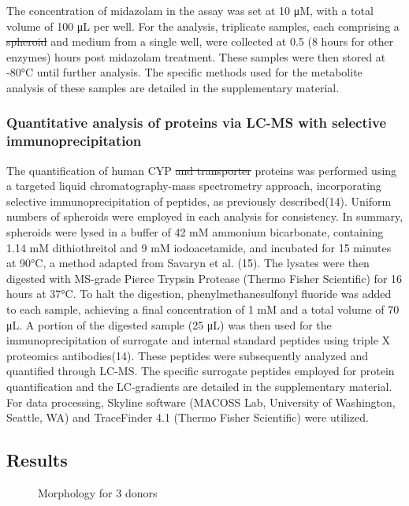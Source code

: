 \documentclass[
  letterpaper,
  DIV=11,
  numbers=noendperiod,
  oneside]{scrartcl}
\begin{document}
The concentration of midazolam in the assay was set at 10 μM, with a
total volume of 100 μL per well. For the analysis, triplicate samples,
each comprising a \st{spheroid} and medium from a single well, were
collected at 0.5 (8 hours for other enzymes) hours post midazolam
treatment. These samples were then stored at -80°C until further
analysis. The specific methods used for the metabolite analysis of these
samples are detailed in the supplementary material.

\subsubsection{Quantitative analysis of proteins via LC-MS with
selective
immunoprecipitation}\label{quantitative-analysis-of-proteins-via-lc-ms-with-selective-immunoprecipitation}

The quantification of human CYP \st{and transporter} proteins was
performed using a targeted liquid chromatography-mass spectrometry
approach, incorporating selective immunoprecipitation of peptides, as
previously described(14). Uniform numbers of spheroids were employed in
each analysis for consistency. In summary, spheroids were lysed in a
buffer of 42 mM ammonium bicarbonate, containing 1.14 mM dithiothreitol
and 9 mM iodoacetamide, and incubated for 15 minutes at 90°C, a method
adapted from Savaryn et al. (15). The lysates were then digested with
MS-grade Pierce Trypsin Protease (Thermo Fisher Scientific) for 16 hours
at 37°C. To halt the digestion, phenylmethanesulfonyl fluoride was added
to each sample, achieving a final concentration of 1 mM and a total
volume of 70 μL. A portion of the digested sample (25 μL) was then used
for the immunoprecipitation of surrogate and internal standard peptides
using triple X proteomics antibodies(14). These peptides were
subsequently analyzed and quantified through LC-MS. The specific
surrogate peptides employed for protein quantification and the
LC-gradients are detailed in the supplementary material. For data
processing, Skyline software (MACOSS Lab, University of Washington,
Seattle, WA) and TraceFinder 4.1 (Thermo Fisher Scientific) were
utilized.

\subsection{Results}\label{results}

\begin{figure}


\caption{\label{fig-morph}Morphology for 3 donors}

\end{figure}%
\end{document}
